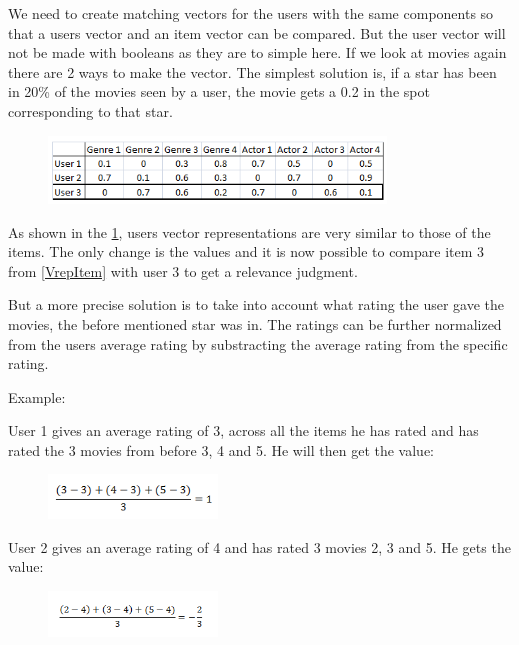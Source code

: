 We need to create matching vectors for the users with the same components so that a users vector and an item vector can be compared. But the user vector will not be made with booleans as they are to simple here. If we look at movies again there are 2 ways to make the vector. The simplest solution is, if a star has been in 20\% of the movies seen by a user, the movie gets a 0.2 in the spot corresponding to that star.

\begin{figure}[H]
\centering
\includegraphics[width=0.8\textwidth]{Images/VectorrepresentationUsers.png}
\caption{}
\label{VrepUser}
\end{figure}

As shown in the \ref{VrepUser}, users vector representations are very similar to those of the items. The only change is the values and it is now possible to compare item 3 from \ref{VrepItem} with user 3 to get a relevance judgment.

But a more precise solution is to take into account what rating the user gave the movies, the before mentioned star was in. The ratings can be further normalized from the users average rating by substracting the average rating from the specific rating.

Example:

User 1 gives an average rating of 3, across all the items he has rated and has rated the 3 movies from before 3, 4 and 5. He will then get the value:

\begin{figure}[H]
\centering
\includegraphics[width=0.4\textwidth]{Images/Userfeature1.png}
\caption{}
\label{Feature1}
\end{figure}

User 2 gives an average rating of 4 and has rated 3 movies 2, 3 and 5. He gets the value:

\begin{figure}[H]
\centering
\includegraphics[width=0.4\textwidth]{Images/Userfeature2.png}
\caption{}
\label{Feature2}
\end{figure}


